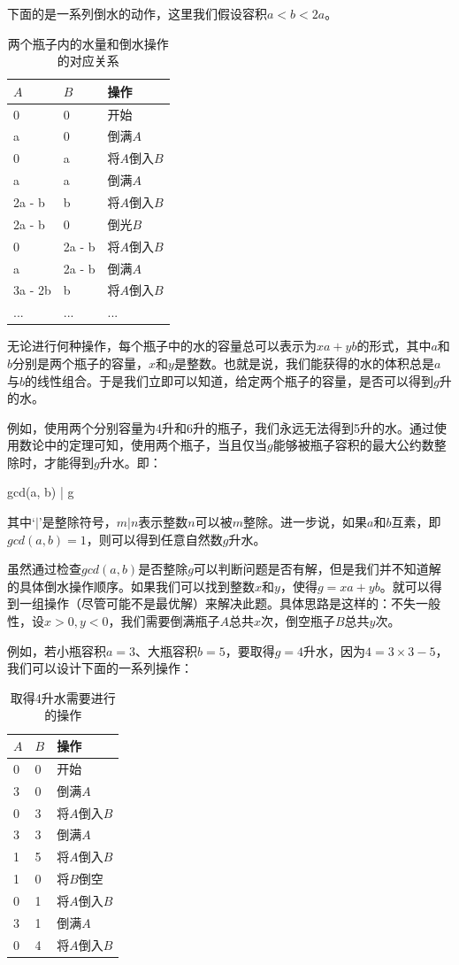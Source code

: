 \documentclass[b5paper]{ctexart}
\begin{document}
下面的是一系列倒水的动作，这里我们假设容积$a < b < 2a$。

\begin{table}[htbp]
\centering
\begin{tabular}{l|l|l}
$A$ & $B$ & 操作 \\
\hline
0 & 0 & 开始 \\
a & 0 & 倒满$A$ \\
0 & a & 将$A$倒入$B$ \\
a & a & 倒满$A$ \\
2a - b & b & 将$A$倒入$B$ \\
2a - b & 0 & 倒光$B$ \\
0 & 2a - b & 将$A$倒入$B$ \\
a & 2a - b & 倒满$A$ \\
3a - 2b & b & 将$A$倒入$B$ \\
... & ... & ... \\
\end{tabular}
\caption{两个瓶子内的水量和倒水操作的对应关系} \label{tab:jug-ops}
\end{table}

无论进行何种操作，每个瓶子中的水的容量总可以表示为$xa + yb$的形式，其中$a$和$b$分别是两个瓶子的容量，$x$和$y$是整数。也就是说，我们能获得的水的体积总是$a$与$b$的线性组合。于是我们立即可以知道，给定两个瓶子的容量，是否可以得到$g$升的水。

例如，使用两个分别容量为4升和6升的瓶子，我们永远无法得到5升的水。通过使用数论中的定理可知，使用两个瓶子，当且仅当$g$能够被瓶子容积的最大公约数整除时，才能得到$g$升水。即：

\be
gcd(a, b) | g
\ee

其中`$|$'是整除符号，$ m | n $表示整数$n$可以被$m$整除。进一步说，如果$a$和$b$互素，即$gcd(a, b) = 1$，则可以得到任意自然数$g$升水。

虽然通过检查$gcd(a, b)$是否整除$g$可以判断问题是否有解，但是我们并不知道解的具体倒水操作顺序。如果我们可以找到整数$x$和$y$，使得$g = xa + yb$。就可以得到一组操作（尽管可能不是最优解）来解决此题。具体思路是这样的：不失一般性，设$x > 0, y < 0$，我们需要倒满瓶子$A$总共$x$次，倒空瓶子$B$总共$y$次。

例如，若小瓶容积$a=3$、大瓶容积$b=5$，要取得$g=4$升水，因为$4 = 3 \times 3 - 5$，我们可以设计下面的一系列操作：

\begin{table}[htbp]
\centering
\begin{tabular}{l|l|l}
$A$ & $B$ & 操作 \\
\hline
0 & 0 & 开始 \\
3 & 0 & 倒满$A$ \\
0 & 3 & 将$A$倒入$B$ \\
3 & 3 & 倒满$A$ \\
1 & 5 & 将$A$倒入$B$ \\
1 & 0 & 将$B$倒空 \\
0 & 1 & 将$A$倒入$B$ \\
3 & 1 & 倒满$A$ \\
0 & 4 & 将$A$倒入$B$ \\
\end{tabular}
\caption{取得4升水需要进行的操作} \label{tab:designed-jugs-ops}
\end{table}
\end{document}
